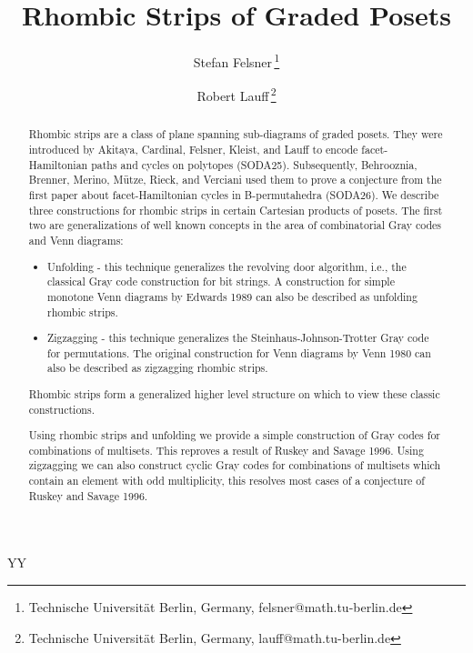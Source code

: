 \documentclass[fontsize=11pt,a4paper,DIV=12]{scrartcl}
\newcommand{\anonymous}{Y} %
\begin{document}
\title{\huge Rhombic Strips of Graded Posets}
\if\anonymous Y{
    \author{}
}\else
{
    \author{
    Stefan Felsner\,\thanks{Technische Universit\"at Berlin, Germany, felsner@math.tu-berlin.de} \and
    Robert Lauff\,\thanks{Technische Universit\"at Berlin, Germany, lauff@math.tu-berlin.de}
    }
}
\fi

\date{}

\maketitle
\vspace{-30pt}
\begin{abstract}
Rhombic strips are a class of plane
spanning sub-diagrams of graded posets.
They were introduced by Akitaya, Cardinal, Felsner,
Kleist, and Lauff to encode facet-Hamiltonian paths and
cycles on polytopes (SODA25). Subsequently, Behrooznia, Brenner,
Merino, Mütze, Rieck, and Verciani used them to prove a
conjecture from the first paper about facet-Hamiltonian
cycles in B-permutahedra (SODA26). We describe
three constructions for rhombic strips in certain Cartesian
products of posets. The first two are generalizations of well
known concepts in the area of combinatorial Gray codes and Venn diagrams:
\begin{itemize}
    \item Unfolding - this technique generalizes the revolving door algorithm,
        i.e., the classical Gray code construction for bit strings.
        A construction for simple monotone Venn diagrams by Edwards 1989
        can also be described as unfolding rhombic strips.
    \item Zigzagging - this technique generalizes the Steinhaus-Johnson-Trotter
        Gray code for permutations. The original construction for Venn diagrams by
        Venn 1980 can also be described as zigzagging rhombic strips.
\end{itemize}

Rhombic strips form a generalized higher
level structure on which to view these classic constructions.

Using rhombic strips and unfolding we provide a simple
construction of Gray codes for combinations
of multisets. This reproves a result of Ruskey
and Savage 1996. Using zigzagging we can also
construct cyclic Gray codes for combinations of
multisets which contain an element with
odd multiplicity, this resolves most cases of a conjecture of
Ruskey and Savage 1996.


\end{abstract}
\end{document}
